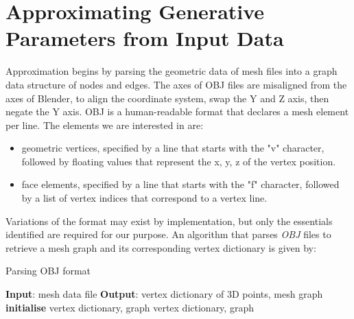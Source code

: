 \documentclass[ %
author={Dillon Keith Diep},
supervisor={Dr. Carl Henrik Ek},
degree={MEng},
title={ART-CG:},
subtitle={Assisted Real-time Content Generation of 3D Hair by Learning Manifolds},
type={Research},
year={2017} ]{dissertation}
\begin{document}
\section{Approximating Generative Parameters from Input Data}

Approximation begins by parsing the geometric data of mesh files into a graph data structure of nodes and edges. The axes of OBJ files are misaligned from the axes of Blender, to align the coordinate system, swap the Y and Z axis, then negate the Y axis. OBJ is a human-readable format that declares a mesh element per line. The elements we are interested in are:
\begin{itemize}
	\item geometric vertices, specified by a line that starts with the "v" character, followed by floating values that represent the x, y, z of the vertex position.
	\item face elements, specified by a line that starts with the "f" character, followed by a list of vertex indices that correspond to a vertex line.
\end{itemize}
Variations of the format may exist by implementation, but only the essentials identified are required for our purpose. An algorithm that parses \textit{OBJ} files to retrieve a mesh graph and its corresponding vertex dictionary is given by:

\begin{algorithm}[!h]
	\caption{Parsing OBJ format}
	\algrule
	\textbf{Input}: mesh data file\;
	\textbf{Output}: vertex dictionary of 3D points, mesh graph\;
	\algrule
	\textbf{initialise} vertex dictionary, graph\;
	\Return vertex dictionary, graph
\end{algorithm}
\end{document}
